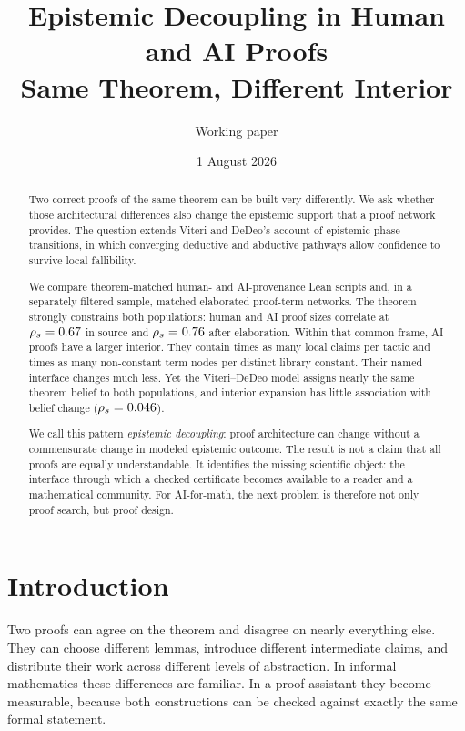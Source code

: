 \documentclass[11pt]{article}
\title{\textbf{Epistemic Decoupling in Human and AI Proofs}\\
\large Same Theorem, Different Interior}
\author{Working paper}
\date{1 August 2026}
\begin{document}
\maketitle

\begin{abstract}
Two correct proofs of the same theorem can be built very differently.  We ask whether those
architectural differences also change the epistemic support that a proof network provides.  The
question extends Viteri and DeDeo's account of epistemic phase transitions, in which converging
deductive and abductive pathways allow confidence to survive local fallibility.

We compare \SourcePairs{} theorem-matched human- and AI-provenance Lean scripts and, in a separately
filtered sample, \TermPairs{} matched elaborated proof-term networks.  The theorem strongly constrains
both populations: human and AI proof sizes correlate at $\rho_s=0.67$ in source and
$\rho_s=0.76$ after elaboration.  Within that common frame, AI proofs have a larger interior.
They contain \HaveRatio{} times as many local claims per tactic and \InteriorRatio{} times as many
non-constant term nodes per distinct library constant.  Their named interface changes much less.
Yet the Viteri--DeDeo model assigns nearly the same theorem belief to both populations, and interior
expansion has little association with belief change ($\rho_s=0.046$).

We call this pattern \emph{epistemic decoupling}: proof architecture can change without a
commensurate change in modeled epistemic outcome.  The result is not a claim that all proofs are
equally understandable.  It identifies the missing scientific object: the interface through which
a checked certificate becomes available to a reader and a mathematical community.  For AI-for-math,
the next problem is therefore not only proof search, but proof design.
\end{abstract}

\section{Introduction}

Two proofs can agree on the theorem and disagree on nearly everything else.  They can choose
different lemmas, introduce different intermediate claims, and distribute their work across
different levels of abstraction.  In informal mathematics these differences are familiar.  In a
proof assistant they become measurable, because both constructions can be checked against exactly
the same formal statement.
\end{document}
